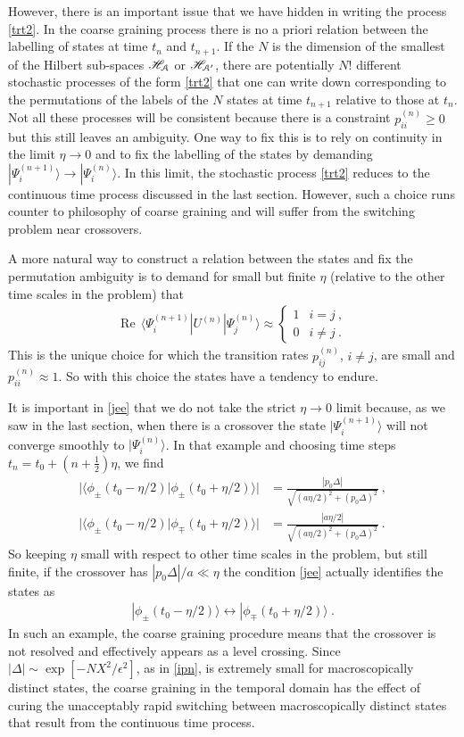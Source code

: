 \documentclass[12pt]{article}
\def\BA{{\EuScript A}}
\def\BH{{\mathscr H}}
\newcommand{\RE}{\operatorname{Re}}
\def\ket#1{| #1\rangle}
\def\braket#1#2{\VEV{#1 | #2}}
\def\VEV#1{\langle #1\rangle}
\newcommand{\EQ}[1]{\begin{equation}\begin{split} #1
\end{split}\end{equation}}
\begin{document}
However, there is an important issue that we have hidden in writing the process \eqref{trt2}.
In the coarse graining process there is no a priori relation between the labelling of states at time $t_n$ and $t_{n+1}$. If the $N$ is the dimension of the smallest of the Hilbert sub-spaces $\BH_\BA$ or $\BH_{\BA'}$, there are potentially $N!$ different stochastic processes of the form \eqref{trt2} that one can write down corresponding to the permutations of the labels of the $N$ states at time $t_{n+1}$ relative to those at $t_n$. Not all these processes will be consistent because there is a constraint $p_{ii}^{(n)}\geq0$ but this still leaves an ambiguity. One way to fix this is to rely on continuity in the limit $\eta\to0$ and to fix the labelling of the states by demanding
$\ket{\Psi_i^{(n+1)}}\to\ket{\Psi_i^{(n)}}$. In this limit, the stochastic process \eqref{trt2} reduces to the continuous time process discussed in the last section. However, such a choice runs counter to philosophy of coarse graining and will suffer from the switching problem near crossovers. 

A more natural way to construct a relation between the states and fix the permutation ambiguity is to demand for small but finite $\eta$ (relative to the other time scales in the problem) that
\EQ{
\RE\,\langle\Psi^{(n+1)}_i|U^{(n)}\ket{\Psi^{(n)}_j}\approx\begin{cases}1& i=j\ ,\\
0& i\neq j\ .\end{cases}
\label{jee}
}
This is the unique choice for which 
the transition rates $p_{ij}^{(n)}$, $i\neq j$, are small and $p_{ii}^{(n)}\approx1$. So with
this choice the states have a tendency to endure.

It is important in \eqref{jee} that we do not take the strict $\eta\to0$ limit 
because, as we saw in the last section, when there is a crossover the state $\ket{\Psi^{(n+1)}_i}$ will not converge smoothly to $\ket{\Psi^{(n)}_i}$. In that example and choosing time steps $t_n=t_0+(n+\frac12)\eta$, we find
\EQ{
\Big|\braket{\phi_\pm(t_0-\eta/2)}{\phi_\pm(t_0+\eta/2)}\Big|
&=\frac{|p_0\Delta|}{\sqrt{(a\eta/2)^2+(p_0\Delta)^2}}\ ,\\
\Big|\braket{\phi_\pm(t_0-\eta/2)}{\phi_\mp(t_0+\eta/2)}\Big|
&=\frac{|a\eta/2|}{\sqrt{(a\eta/2)^2+(p_0\Delta)^2}}\ .
}
So keeping $\eta$ small with respect to other time scales in the problem, but still finite, if the crossover has $|p_0\Delta|/a\ll\eta$ the condition \eqref{jee} actually identifies the states as
\EQ{
\ket{\phi_\pm(t_0-\eta/2)}\longleftrightarrow
\ket{\phi_\mp(t_0+\eta/2)}\ .
}
In such an example, the coarse graining procedure means that the crossover is not resolved and effectively appears as a level crossing. Since $|\Delta|\sim\exp[-NX^2/\epsilon^2]$, as in \eqref{ipn}, is extremely small for macroscopically distinct states, the coarse graining in the temporal domain has the effect of curing the unacceptably rapid
switching between macroscopically distinct states that result from the continuous time process.
\end{document}
